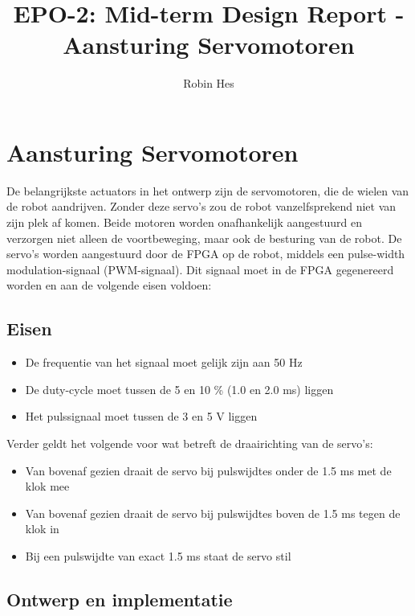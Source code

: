 \documentclass{report}
\title{EPO-2: Mid-term Design Report - Aansturing Servomotoren}
\author{Robin Hes}
\begin{document}
\chapter{Aansturing Servomotoren}
\label{ch:servo}

De belangrijkste actuators in het ontwerp zijn de servomotoren, die de wielen van de robot aandrijven.
Zonder deze servo's zou de robot vanzelfsprekend niet van zijn plek af komen.
Beide motoren worden onafhankelijk aangestuurd en verzorgen niet alleen de voortbeweging, maar ook de besturing van de robot.
De servo's worden aangestuurd door de FPGA op de robot, middels een pulse-width modulation-signaal (PWM-signaal).
Dit signaal moet in de FPGA gegenereerd worden en aan de volgende eisen voldoen:

\section{Eisen}
\label{sec:servo-eisen}

\begin{itemize}
	\item De frequentie van het signaal moet gelijk zijn aan 50 Hz
	\item De duty-cycle moet tussen de 5 en 10 \% (1.0 en 2.0 ms) liggen
	\item Het pulssignaal moet tussen de 3 en 5 V liggen
\end{itemize}

\noindent
Verder geldt het volgende voor wat betreft de draairichting van de servo's:

\begin{itemize}
	\item Van bovenaf gezien draait de servo bij pulswijdtes onder de 1.5 ms met de klok mee
	\item Van bovenaf gezien draait de servo bij pulswijdtes boven de 1.5 ms tegen de klok in
	\item Bij een pulswijdte van exact 1.5 ms staat de servo stil
\end{itemize}

\section{Ontwerp en implementatie}
\label{sec:servo-design}
\end{document}
